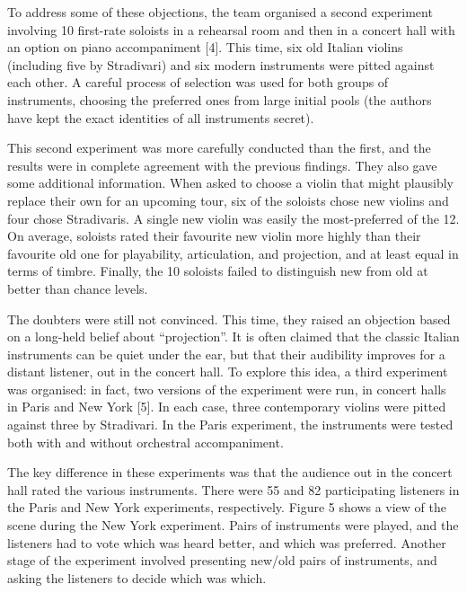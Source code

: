   To address some of these objections, the team organised a second experiment 
  involving 10 first-rate soloists in a rehearsal room and then in a concert 
  hall with an option on piano accompaniment [4]. This time, six old Italian 
  violins (including five by Stradivari) and six modern instruments were pitted 
  against each other. A careful process of selection was used for both groups 
  of instruments, choosing the preferred ones from large initial pools (the 
  authors have kept the exact identities of all instruments secret). 

  This second experiment was more carefully conducted than the first, and the 
  results were in complete agreement with the previous findings. They also gave 
  some additional information. When asked to choose a violin that might 
  plausibly replace their own for an upcoming tour, six of the soloists chose 
  new violins and four chose Stradivaris. A single new violin was easily the 
  most-preferred of the 12. On average, soloists rated their favourite new 
  violin more highly than their favourite old one for playability, 
  articulation, and projection, and at least equal in terms of timbre. Finally, 
  the 10 soloists failed to distinguish new from old at better than chance 
  levels. 

  The doubters were still not convinced. This time, they raised an objection 
  based on a long-held belief about “projection”. It is often claimed that the 
  classic Italian instruments can be quiet under the ear, but that their 
  audibility improves for a distant listener, out in the concert hall. To 
  explore this idea, a third experiment was organised: in fact, two versions of 
  the experiment were run, in concert halls in Paris and New York [5]. In each 
  case, three contemporary violins were pitted against three by Stradivari. In 
  the Paris experiment, the instruments were tested both with and without 
  orchestral accompaniment. 

  The key difference in these experiments was that the audience out in the 
  concert hall rated the various instruments. There were 55 and 82 
  participating listeners in the Paris and New York experiments, respectively. 
  Figure 5 shows a view of the scene during the New York experiment. Pairs of 
  instruments were played, and the listeners had to vote which was heard 
  better, and which was preferred. Another stage of the experiment involved 
  presenting new/old pairs of instruments, and asking the listeners to decide 
  which was which. 


